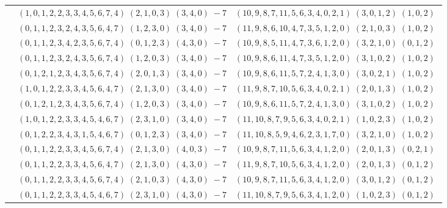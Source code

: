 \documentclass[11pt]{article}
\begin{document}
\begin{longtable}[l]{|c|c|c|}
 \cline{2-3} 
 & $(1 ,0 ,1 ,2 ,2 ,3 ,3 ,4 ,5 ,6 ,7 ,4) \;(2 ,1 ,0 ,3) \;(3 ,4 ,0) \;-7$ & $(10 ,9 ,8 ,7 ,11 ,5 ,6 ,3 ,4 ,0 ,2 ,1) \;(3 ,0 ,1 ,2) \;(1 ,0 ,2) \;$\\ 
 \cline{2-3} 
 & $(0 ,1 ,1 ,2 ,3 ,2 ,4 ,3 ,5 ,6 ,4 ,7) \;(1 ,2 ,3 ,0) \;(3 ,4 ,0) \;-7$ & $(11 ,9 ,8 ,6 ,10 ,4 ,7 ,3 ,5 ,1 ,2 ,0) \;(2 ,1 ,0 ,3) \;(1 ,0 ,2) \;$\\ 
 \cline{2-3} 
 & $(0 ,1 ,1 ,2 ,3 ,4 ,2 ,3 ,5 ,6 ,7 ,4) \;(0 ,1 ,2 ,3) \;(4 ,3 ,0) \;-7$ & $(10 ,9 ,8 ,5 ,11 ,4 ,7 ,3 ,6 ,1 ,2 ,0) \;(3 ,2 ,1 ,0) \;(0 ,1 ,2) \;$\\ 
 \cline{2-3} 
 & $(0 ,1 ,1 ,2 ,3 ,2 ,4 ,3 ,5 ,6 ,7 ,4) \;(1 ,2 ,0 ,3) \;(3 ,4 ,0) \;-7$ & $(10 ,9 ,8 ,6 ,11 ,4 ,7 ,3 ,5 ,1 ,2 ,0) \;(3 ,1 ,0 ,2) \;(1 ,0 ,2) \;$\\ 
 \cline{2-3} 
 & $(0 ,1 ,2 ,1 ,2 ,3 ,4 ,3 ,5 ,6 ,7 ,4) \;(2 ,0 ,1 ,3) \;(3 ,4 ,0) \;-7$ & $(10 ,9 ,8 ,6 ,11 ,5 ,7 ,2 ,4 ,1 ,3 ,0) \;(3 ,0 ,2 ,1) \;(1 ,0 ,2) \;$\\ 
 \cline{2-3} 
 & $(1 ,0 ,1 ,2 ,2 ,3 ,3 ,4 ,5 ,6 ,4 ,7) \;(2 ,1 ,3 ,0) \;(3 ,4 ,0) \;-7$ & $(11 ,9 ,8 ,7 ,10 ,5 ,6 ,3 ,4 ,0 ,2 ,1) \;(2 ,0 ,1 ,3) \;(1 ,0 ,2) \;$\\ 
 \cline{2-3} 
 & $(0 ,1 ,2 ,1 ,2 ,3 ,4 ,3 ,5 ,6 ,7 ,4) \;(1 ,2 ,0 ,3) \;(3 ,4 ,0) \;-7$ & $(10 ,9 ,8 ,6 ,11 ,5 ,7 ,2 ,4 ,1 ,3 ,0) \;(3 ,1 ,0 ,2) \;(1 ,0 ,2) \;$\\ 
 \cline{2-3} 
 & $(1 ,0 ,1 ,2 ,2 ,3 ,3 ,4 ,5 ,4 ,6 ,7) \;(2 ,3 ,1 ,0) \;(3 ,4 ,0) \;-7$ & $(11 ,10 ,8 ,7 ,9 ,5 ,6 ,3 ,4 ,0 ,2 ,1) \;(1 ,0 ,2 ,3) \;(1 ,0 ,2) \;$\\ 
 \cline{2-3} 
 & $(0 ,1 ,2 ,2 ,3 ,4 ,3 ,1 ,5 ,4 ,6 ,7) \;(0 ,1 ,2 ,3) \;(3 ,4 ,0) \;-7$ & $(11 ,10 ,8 ,5 ,9 ,4 ,6 ,2 ,3 ,1 ,7 ,0) \;(3 ,2 ,1 ,0) \;(1 ,0 ,2) \;$\\ 
 \cline{2-3} 
 & $(0 ,1 ,1 ,2 ,2 ,3 ,3 ,4 ,5 ,6 ,7 ,4) \;(2 ,1 ,3 ,0) \;(4 ,0 ,3) \;-7$ & $(10 ,9 ,8 ,7 ,11 ,5 ,6 ,3 ,4 ,1 ,2 ,0) \;(2 ,0 ,1 ,3) \;(0 ,2 ,1) \;$\\ 
 \cline{2-3} 
 & $(0 ,1 ,1 ,2 ,2 ,3 ,3 ,4 ,5 ,6 ,4 ,7) \;(2 ,1 ,3 ,0) \;(4 ,3 ,0) \;-7$ & $(11 ,9 ,8 ,7 ,10 ,5 ,6 ,3 ,4 ,1 ,2 ,0) \;(2 ,0 ,1 ,3) \;(0 ,1 ,2) \;$\\ 
 \cline{2-3} 
 & $(0 ,1 ,1 ,2 ,2 ,3 ,3 ,4 ,5 ,6 ,7 ,4) \;(2 ,1 ,0 ,3) \;(4 ,3 ,0) \;-7$ & $(10 ,9 ,8 ,7 ,11 ,5 ,6 ,3 ,4 ,1 ,2 ,0) \;(3 ,0 ,1 ,2) \;(0 ,1 ,2) \;$\\ 
 \cline{2-3} 
 & $(0 ,1 ,1 ,2 ,2 ,3 ,3 ,4 ,5 ,4 ,6 ,7) \;(2 ,3 ,1 ,0) \;(4 ,3 ,0) \;-7$ & $(11 ,10 ,8 ,7 ,9 ,5 ,6 ,3 ,4 ,1 ,2 ,0) \;(1 ,0 ,2 ,3) \;(0 ,1 ,2) \;$\\ 

\end{longtable}
\end{document}
